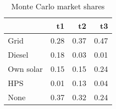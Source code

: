 \begin{table}[!ht]
	\centering
		\caption{Monte Carlo market shares}
\begin{tabular}{lrrr}
		\toprule
               &        t1&        t2&        t3\\
		\midrule
		           Grid&      0.28&      0.37&      0.47\\
		         Diesel&      0.18&      0.03&      0.01\\
		      Own solar&      0.15&      0.15&      0.24\\
		            HPS&      0.01&      0.13&      0.04\\
		           None&      0.37&      0.32&      0.24\\
		\bottomrule
	\end{tabular}
\end{table}

